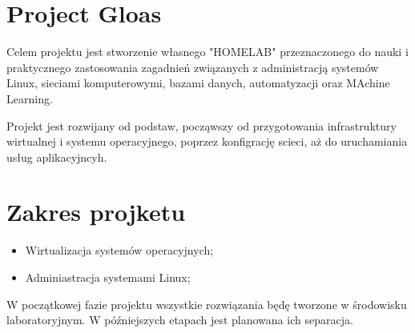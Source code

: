 \section{Project Gloas}

Celem projektu jest stworzenie własnego "HOMELAB" przeznaczonego do nauki i praktycznego zastosowania 
zagadnień związanych z administracją systemów Linux, sieciami komputerowymi, bazami danych, automatyzacji oraz MAchine Learning.

Projekt jest rozwijany od podstaw, począwszy od przygotowania infrastruktury wirtualnej i systemu operacyjnego, poprzez konfigrację scieci,
aż do uruchamiania usług aplikacyjncyh.

\section{Zakres projketu}

\begin{itemize}
    \item Wirtualizacja systemów operacyjnych;
    \item Adminiastracja systemami Linux;
\end{itemize}

W początkowej fazie projektu wszystkie rozwiązania będę tworzone w środowisku laboratoryjnym. W późniejszych etapach jest planowana ich separacja.